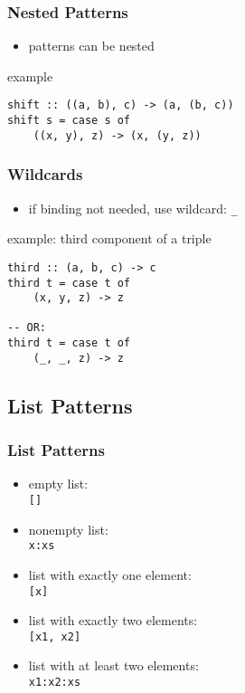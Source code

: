 \documentclass[dvipsnames]{beamer}
\theoremstyle{plain}
\begin{document}
\begin{frame}[fragile]
  \frametitle{Nested Patterns}

  \begin{itemize}
    \item patterns can be nested
  \end{itemize}

  \begin{exampleblock}{example}
    \begin{lstlisting}
shift :: ((a, b), c) -> (a, (b, c))
shift s = case s of
    ((x, y), z) -> (x, (y, z))
    \end{lstlisting}
  \end{exampleblock}
\end{frame}

\begin{frame}[fragile]
  \frametitle{Wildcards}

  \begin{itemize}
    \item if binding not needed, use wildcard: \lstinline|_|
  \end{itemize}

  \begin{exampleblock}{example: third component of a triple}
    \begin{lstlisting}
third :: (a, b, c) -> c
third t = case t of
    (x, y, z) -> z

-- OR:
third t = case t of
    (_, _, z) -> z
    \end{lstlisting}
  \end{exampleblock}
\end{frame}

\subsection{List Patterns}

\begin{frame}[fragile]
  \frametitle{List Patterns}

  \begin{itemize}
    \item empty list:\\
      \lstinline|[]|
    \item nonempty list:\\
      \lstinline|x:xs|
    \item list with exactly one element:\\
      \lstinline|[x]|
    \item list with exactly two elements:\\
      \lstinline|[x1, x2]|
    \item list with at least two elements:\\
      \lstinline|x1:x2:xs|
  \end{itemize}
\end{frame}
\end{document}
